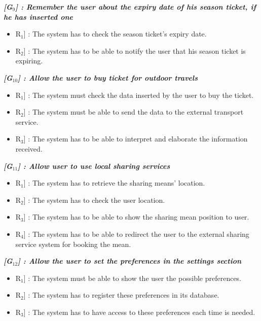 \vspace{0.5cm}
\noindent
\emph{\textbf{[G$_{9}$] : Remember the user about the expiry date of his season ticket, if he has inserted one}}
\begin{itemize}
	\setlength{\leftskip}{0.5cm}
	\item \lbrack R$_{1}$] : The system has to check the season ticket’s expiry date.
	\item \lbrack R$_{2}$] : The system has to be able to notify the user that his season ticket is expiring.
\end{itemize}

\vspace{0.5cm}
\noindent
\emph{\textbf{[G$_{10}$] : Allow the user to buy ticket for outdoor travels}}
\begin{itemize}
	\setlength{\leftskip}{0.5cm}
	\item \lbrack R$_{1}$] : The system must check the data inserted by the user to buy the ticket.
	\item \lbrack R$_{2}$] : The system must be able to send the data to the external transport service.
	\item \lbrack R$_{3}$] : The system has to be able to interpret and elaborate the information received.
\end{itemize}

\vspace{0.5cm}
\noindent
\emph{\textbf{[G$_{11}$] : Allow user to use local sharing services}}
\begin{itemize}
	\setlength{\leftskip}{0.5cm}
	\item \lbrack R$_{1}$] : The system has to retrieve the sharing means’ location.
	\item \lbrack R$_{2}$] : The system has to check the user location.
	\item \lbrack R$_{3}$] : The system has to be able to show the sharing mean position to user.
	\item \lbrack R$_{4}$] : The system has to be able to redirect the user to the external sharing service system for booking the mean.
\end{itemize}

\vspace{0.5cm}
\noindent
\emph{\textbf{[G$_{12}$] : Allow the user to set the preferences in the settings section}}
\begin{itemize}
	\setlength{\leftskip}{0.5cm}
	\item \lbrack R$_{1}$] : The system must be able to show the user the possible preferences.
	\item \lbrack R$_{2}$] : The system has to register these preferences in its database.
	\item \lbrack R$_{3}$] : The system has to have access to these preferences each time is needed.
\end{itemize}


